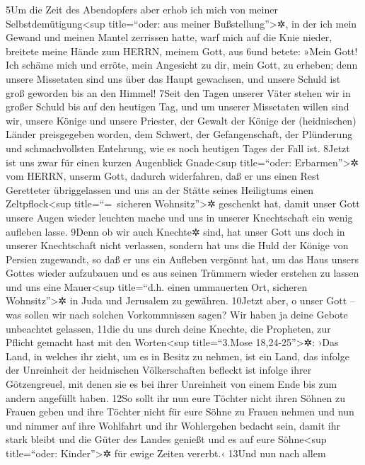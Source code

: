 5Um die Zeit des Abendopfers aber erhob ich mich von meiner
Selbstdemütigung\textless sup title=``oder: aus meiner
Bußstellung''\textgreater✲, in der ich mein Gewand und meinen Mantel
zerrissen hatte, warf mich auf die Knie nieder, breitete meine Hände zum
HERRN, meinem Gott, aus 6und betete: »Mein Gott! Ich schäme mich und
erröte, mein Angesicht zu dir, mein Gott, zu erheben; denn unsere
Missetaten sind uns über das Haupt gewachsen, und unsere Schuld ist groß
geworden bis an den Himmel! 7Seit den Tagen unserer Väter stehen wir in
großer Schuld bis auf den heutigen Tag, und um unserer Missetaten willen
sind wir, unsere Könige und unsere Priester, der Gewalt der Könige der
(heidnischen) Länder preisgegeben worden, dem Schwert, der
Gefangenschaft, der Plünderung und schmachvollsten Entehrung, wie es
noch heutigen Tages der Fall ist. 8Jetzt ist uns zwar für einen kurzen
Augenblick Gnade\textless sup title=``oder: Erbarmen''\textgreater✲ vom
HERRN, unserm Gott, dadurch widerfahren, daß er uns einen Rest
Geretteter übriggelassen und uns an der Stätte seines Heiligtums einen
Zeltpflock\textless sup title=``=~sicheren Wohnsitz''\textgreater✲
geschenkt hat, damit unser Gott unsere Augen wieder leuchten mache und
uns in unserer Knechtschaft ein wenig aufleben lasse. 9Denn ob wir auch
Knechte✲ sind, hat unser Gott uns doch in unserer Knechtschaft nicht
verlassen, sondern hat uns die Huld der Könige von Persien zugewandt, so
daß er uns ein Aufleben vergönnt hat, um das Haus unsers Gottes wieder
aufzubauen und es aus seinen Trümmern wieder erstehen zu lassen und uns
eine Mauer\textless sup title=``d.h. einen ummauerten Ort, sicheren
Wohnsitz''\textgreater✲ in Juda und Jerusalem zu gewähren. 10Jetzt aber,
o unser Gott -- was sollen wir nach solchen Vorkommnissen sagen? Wir
haben ja deine Gebote unbeachtet gelassen, 11die du uns durch deine
Knechte, die Propheten, zur Pflicht gemacht hast mit den
Worten\textless sup title=``3.Mose 18,24-25''\textgreater✲: ›Das Land,
in welches ihr zieht, um es in Besitz zu nehmen, ist ein Land, das
infolge der Unreinheit der heidnischen Völkerschaften befleckt ist
infolge ihrer Götzengreuel, mit denen sie es bei ihrer Unreinheit von
einem Ende bis zum andern angefüllt haben. 12So sollt ihr nun eure
Töchter nicht ihren Söhnen zu Frauen geben und ihre Töchter nicht für
eure Söhne zu Frauen nehmen und nun und nimmer auf ihre Wohlfahrt und
ihr Wohlergehen bedacht sein, damit ihr stark bleibt und die Güter des
Landes genießt und es auf eure Söhne\textless sup title=``oder:
Kinder''\textgreater✲ für ewige Zeiten vererbt.‹ 13Und nun nach allem

